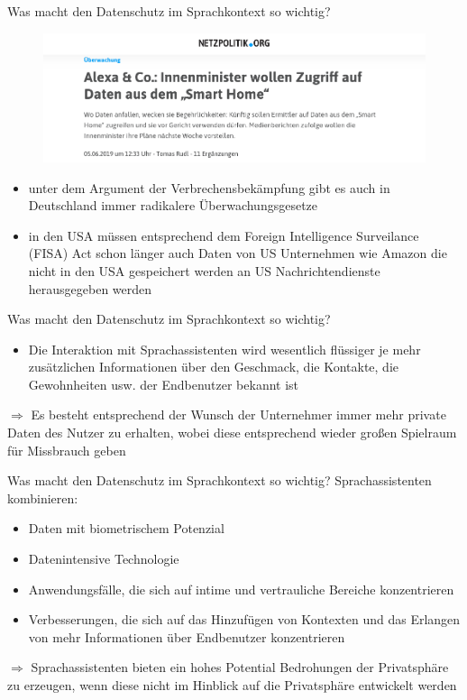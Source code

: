 \documentclass[aspectratio=169]{beamer}
\begin{document}
\begin{frame}{Was macht den Datenschutz im Sprachkontext so wichtig?}
	\begin{figure}
		\includegraphics[scale=0.3]{images/alexa-police-access}
	\end{figure}
	\begin{itemize} 
		\item unter dem Argument der Verbrechensbekämpfung gibt es auch in Deutschland immer radikalere Überwachungsgesetze
		\item in den USA müssen entsprechend dem Foreign Intelligence Surveilance (FISA) Act schon länger auch Daten von US Unternehmen wie Amazon die nicht in den USA gespeichert werden an US Nachrichtendienste herausgegeben werden
    \end{itemize}
\end{frame}

\begin{frame}{Was macht den Datenschutz im Sprachkontext so wichtig?}
	\begin{itemize} 
		\item Die Interaktion mit Sprachassistenten wird wesentlich flüssiger je mehr zusätzlichen Informationen über den Geschmack, die Kontakte, die Gewohnheiten usw. der Endbenutzer bekannt ist
	\end{itemize}
    $\Rightarrow$ Es besteht entsprechend der Wunsch der Unternehmer immer mehr private Daten des Nutzer zu erhalten, wobei diese entsprechend wieder großen Spielraum für Missbrauch geben
\end{frame}


\begin{frame}{Was macht den Datenschutz im Sprachkontext so wichtig?}
	Sprachassistenten kombinieren:
	\begin{itemize} 
		\item Daten mit biometrischem Potenzial
		\item Datenintensive Technologie
		\item Anwendungsfälle, die sich auf intime und vertrauliche Bereiche konzentrieren
		\item Verbesserungen, die sich auf das Hinzufügen von Kontexten und das Erlangen von mehr Informationen über Endbenutzer konzentrieren
	\end{itemize}
     $\Rightarrow$ Sprachassistenten bieten ein hohes Potential Bedrohungen der Privatsphäre zu erzeugen, wenn diese nicht im Hinblick auf die Privatsphäre entwickelt werden
\end{frame}
\end{document}
